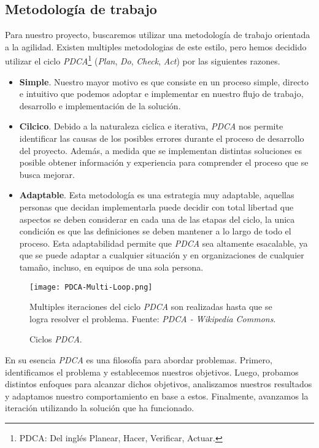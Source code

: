 

\subsection{Metodología de trabajo}
\label{sec:metod-de-trabajo}

Para nuestro proyecto, buscaremos utilizar una metodología de trabajo orientada a la agilidad. Existen multiples metodologias de este estilo, pero hemos decidido utilizar el ciclo \textit{PDCA}\footnote{PDCA: Del inglés Planear, Hacer, Verificar, Actuar.} (\textit{Plan}, \textit{Do}, \textit{Check}, \textit{Act}) por las siguientes razones.

\begin{itemize}
    \item \textbf{Simple}. Nuestro mayor motivo es que consiste en un proceso simple, directo e intuitivo que podemos adoptar e implementar en nuestro flujo de trabajo, desarrollo e implementación de la solución.
    \item \textbf{Cilcico}. Debido a la naturaleza ciclica e iterativa, \textit{PDCA} nos permite identificar las causas de los posibles errores durante el proceso de desarrollo del proyecto. Además, a medida que se implementan distintas soluciones es posible obtener información y experiencia para comprender el proceso que se busca mejorar.
    \item \textbf{Adaptable}. Esta metodología es una estrategia muy adaptable, aquellas personas que decidan implementarla puede decidir con total libertad que aspectos se deben considerar en cada una de las etapas del ciclo, la unica condición es que las definiciones se deben mantener a lo largo de todo el proceso. Esta adaptabilidad permite que \textit{PDCA} sea altamente esacalable, ya que se puede adaptar a cualquier situación y en organizaciones de cualquier tamaño, incluso, en equipos de una sola persona.
\end{itemize}

\begin{figure}[ht]
    \centering
    \texttt{[image: PDCA-Multi-Loop.png]}
    \caption{Ciclos \textit{PDCA}.} Multiples iteraciones del ciclo \textit{PDCA} son realizadas hasta que se logra resolver el problema. Fuente: \textit{PDCA - Wikipedia Commons}.
    \label{fig:pdca-cycle}
\end{figure}

En su esencia \textit{PDCA} es una filosofía para abordar problemas. Primero, identificamos el problema y establecemos nuestros objetivos. Luego, probamos distintos enfoques para alcanzar dichos objetivos, analiszamos nuestros resultados y adaptamos nuestro comportamiento en base a estos. Finalmente, avanzamos la iteración utilizando la solución que ha funcionado.

